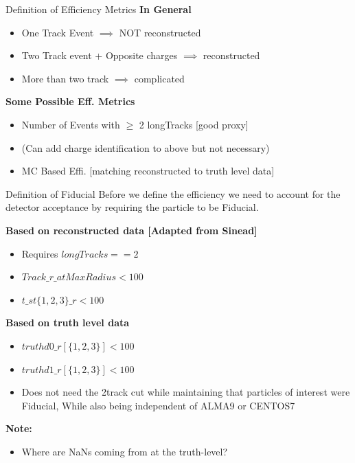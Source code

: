 \begin{frame}{Definition of Efficiency Metrics}
    \textbf{In General}
	\begin{itemize}
        \item One Track Event $\implies$ NOT reconstructed
        \item Two Track event + Opposite charges $\implies$ reconstructed 
        \item More than two track $\implies$ complicated
    \end{itemize}
    \vspace{1 cm}
    \textbf{Some Possible Eff. Metrics}
    \begin{itemize}
        \item Number of Events with $\geq$ 2 longTracks [good proxy]
        \item (Can add charge identification to above but not necessary)
        \item MC Based Effi. [matching reconstructed to truth level data]
    \end{itemize}
\end{frame}

\begin{frame}{Definition of Fiducial}
    Before we define the efficiency we need to account for the detector acceptance by requiring the particle to be Fiducial.

		\textbf{Based on reconstructed data [Adapted from Sinead]}
		\begin{itemize}
			\item Requires $longTracks == 2$ 
			\item $Track\_r\_atMaxRadius < 100$
			\item $t\_st\{1,2,3\}\_r < 100$
 		\end{itemize}
		\textbf{Based on truth level data }
		\begin{itemize}
			\item $truthd0\_r [\{1,2,3\}] < 100$
			\item $truthd1\_r [\{1,2,3\}] < 100$
			\item Does not need the 2track cut while maintaining that particles of interest were Fiducial, While also being independent of ALMA9 or CENTOS7
	
		\end{itemize}

        \textbf{Note:}
        \begin{itemize}
		\item Where are NaNs coming from at the truth-level?
	    \end{itemize}	
\end{frame}

